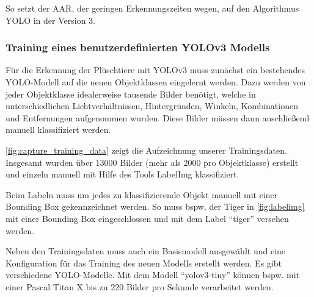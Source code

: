 So setzt der \ac{AAR}, der geringen Erkennungszeiten wegen, auf den Algorithmus \ac{YOLO} in der Version 3.

\subsubsection{Training eines benutzerdefinierten YOLOv3 Modells}

Für die Erkennung der Plüschtiere mit \ac{YOLO}v3 muss zunächst ein bestehendes \ac{YOLO}-Modell auf die neuen Objektklassen eingelernt werden.
Dazu werden von jeder Objektklasse idealerweise tausende Bilder benötigt, welche in unterschiedlichen Lichtverhältnissen, Hintergründen, Winkeln, Kombinationen und Entfernungen aufgenommen wurden.
Diese Bilder müssen dann anschließend manuell klassifiziert werden.


\autoref{fig:capture_training_data} zeigt die Aufzeichnung unserer Trainingsdaten.
Insgesamt wurden über 13000 Bilder (mehr als 2000 pro Objektklasse) erstellt und einzeln manuell mit Hilfe des Tools LabelImg klassifiziert.


Beim Labeln muss um jedes zu klassifizierende Objekt manuell mit einer Bounding Box gekennzeichnet werden.
So muss bspw. der Tiger in \autoref{fig:labelimg} mit einer Bounding Box eingeschlossen und mit dem Label \enquote{tiger} versehen werden.

Neben den Trainingsdaten muss auch ein Basismodell ausgewählt und eine Konfiguration für das Training des neuen Modells erstellt werden.
Es gibt verschiedene \ac{YOLO}-Modelle.
Mit dem Modell \enquote{yolov3-tiny} können bspw. mit einer Pascal Titan X bis zu 220 Bilder pro Sekunde verarbeitet werden.

